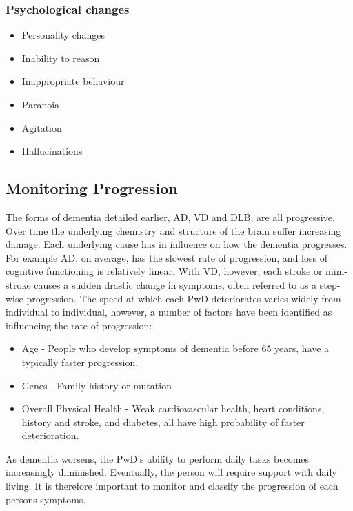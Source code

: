\subsubsection{Psychological changes}

\begin{itemize}[noitemsep,topsep=0pt]
\item Personality changes
\item Inability to reason
\item Inappropriate behaviour
\item Paranoia
\item Agitation
\item Hallucinations
\end{itemize}

\subsection{Monitoring Progression}
The forms of dementia detailed earlier, AD, VD and DLB, are all progressive. Over time the underlying chemistry and structure of the brain suffer increasing damage. Each underlying cause has in influence on how the dementia progresses. For example AD, on average, has the slowest rate of progression, and loss of cognitive functioning is relatively linear. With VD, however, each stroke or mini-stroke causes a sudden drastic change in symptoms, often referred to as a step-wise progression.
The speed at which each PwD deteriorates varies widely from individual to individual, however, a number of factors have been identified as influencing the rate of progression:

\begin{itemize}[noitemsep,topsep=0pt]
\item Age - People who develop symptoms of dementia before 65 years, have a typically faster progression.
\item Genes - Family history or mutation
\item Overall Physical Health - Weak cardiovascular health, heart conditions, history and stroke, and diabetes, all have high probability of faster deterioration.
\end{itemize}

As dementia worsens, the PwD's ability to perform daily tasks becomes increasingly diminished. Eventually, the person will require support with daily living. It is therefore important to monitor and classify the progression of each persons symptoms.

